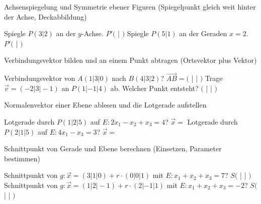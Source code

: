 \setcounter{aufgabe}{0}

\begin{aufgabe}{Achsenspiegelung und Symmetrie ebener Figuren (Spiegelpunkt gleich weit hinter der Achse, Deckabbildung)}
\begin{teile}
\teil Spiegle $P(3 | 2)$ an der $y$-Achse. $P'($ \leerfeld | \leerfeld $)$
\teil Spiegle $P(5 | 1)$ an der Geraden $x = 2$. $P'($ \leerfeld | \leerfeld $)$
\end{teile}
\end{aufgabe}

\begin{aufgabe}{Verbindungsvektor bilden und an einem Punkt abtragen (Ortsvektor plus Vektor)}
\begin{teile}
\teil Verbindungsvektor von $A(1 | 3 | 0)$ nach $B(4 | 3 | 2)$? $\overrightarrow{AB} = ($ \leerfeld | \leerfeld | \leerfeld $)$
\teil Trage $\vec{v} = (-2 | 3 | -1)$ an $P(1 | -1 | 4)$ ab. Welcher Punkt entsteht? $($ \leerfeld | \leerfeld | \leerfeld $)$
\end{teile}
\end{aufgabe}

\begin{aufgabe}{Normalenvektor einer Ebene ablesen und die Lotgerade aufstellen}
\begin{teile}
\teil Lotgerade durch $P(1 | 2 | 5)$ auf $E: 2x_1 - x_2 + x_3 = 4$? $\vec{x} = $ \leerfeld
\teil Lotgerade durch $P(2 | 1 | 5)$ auf $E: 4x_1 - x_3 = 3$? $\vec{x} = $ \leerfeld
\end{teile}
\end{aufgabe}

\begin{aufgabe}{Schnittpunkt von Gerade und Ebene berechnen (Einsetzen, Parameter bestimmen)}
\begin{teile}
\teil Schnittpunkt von $g: \vec{x} = (3 | 1 | 0) + r \cdot (0 | 0 | 1)$ mit $E: x_1 + x_2 + x_3 = 7$? $S($ \leerfeld | \leerfeld | \leerfeld $)$
\teil Schnittpunkt von $g: \vec{x} = (1 | 2 | -1) + r \cdot (2 | -1 | 1)$ mit $E: x_1 + x_2 + x_3 = -2$? $S($ \leerfeld | \leerfeld | \leerfeld $)$
\end{teile}
\end{aufgabe}

